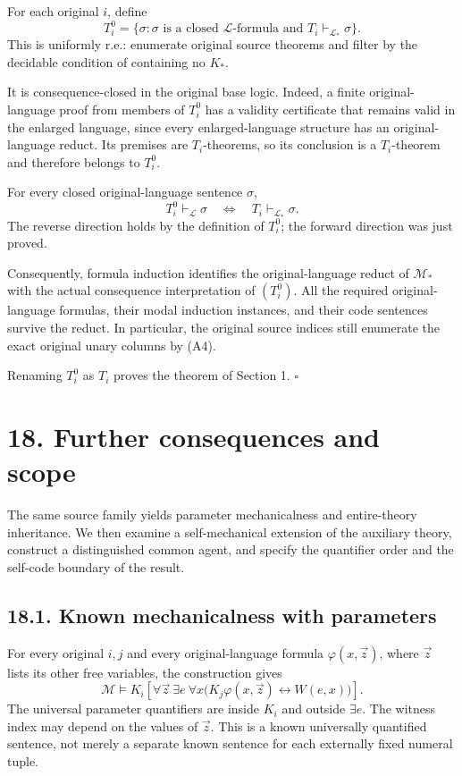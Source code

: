 \documentclass[
  11pt,
  letterpaper,
]{article}
\begin{document}
For each original \(i\), define \[
T_i^0=
\{\sigma:\sigma\text{ is a closed }\mathcal L\text{-formula and }
                         T_i\vdash_{\mathcal L_*}\sigma\}.
\tag{A3}
\] This is uniformly r.e.: enumerate original source theorems and filter
by the decidable condition of containing no \(K_*\).

It is consequence-closed in the original base logic. Indeed, a finite
original-language proof from members of \(T_i^0\) has a validity
certificate that remains valid in the enlarged language, since every
enlarged-language structure has an original-language reduct. Its
premises are \(T_i\)-theorems, so its conclusion is a \(T_i\)-theorem
and therefore belongs to \(T_i^0\).

For every closed original-language sentence \(\sigma\), \[
T_i^0\vdash_{\mathcal L}\sigma
\quad\Longleftrightarrow\quad
T_i\vdash_{\mathcal L_*}\sigma.
\tag{A4}
\] The reverse direction holds by the definition of \(T_i^0\); the
forward direction was just proved.

Consequently, formula induction identifies the original-language reduct
of \(\mathcal M_*\) with the actual consequence interpretation of
\((T_i^0)\). All the required original-language formulas, their modal
induction instances, and their code sentences survive the reduct. In
particular, the original source indices still enumerate the exact
original unary columns by (A4).

Renaming \(T_i^0\) as \(T_i\) proves the theorem of Section 1.
\(\square\)

\section{18. Further consequences and
scope}\label{further-consequences-and-scope}

The same source family yields parameter mechanicalness and entire-theory
inheritance. We then examine a self-mechanical extension of the
auxiliary theory, construct a distinguished common agent, and specify
the quantifier order and the self-code boundary of the result.

\subsection{18.1. Known mechanicalness with
parameters}\label{known-mechanicalness-with-parameters}

For every original \(i,j\) and every original-language formula
\(\varphi(x,\vec z)\), where \(\vec z\) lists its other free variables,
the construction gives \[
\mathcal M\models
K_i\left[
\forall\vec z\ \exists e\ \forall x
 \bigl(K_j\varphi(x,\vec z)\leftrightarrow W(e,x)\bigr)
\right].
\tag{P1}
\] The universal parameter quantifiers are inside \(K_i\) and outside
\(\exists e\). The witness index may depend on the values of \(\vec z\).
This is a known universally quantified sentence, not merely a separate
known sentence for each externally fixed numeral tuple.
\end{document}
